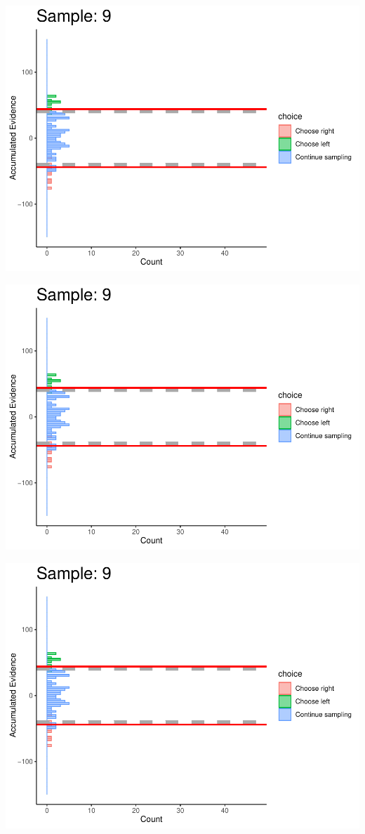\documentclass[
]{book}
\begin{document}
\begin{center}\includegraphics[width=0.8\linewidth]{LateNightBayes_files/figure-latex/collapsing_dcb-83} \end{center}

\begin{center}\includegraphics[width=0.8\linewidth]{LateNightBayes_files/figure-latex/collapsing_dcb-84} \end{center}

\begin{center}\includegraphics[width=0.8\linewidth]{LateNightBayes_files/figure-latex/collapsing_dcb-85} \end{center}
\end{document}
